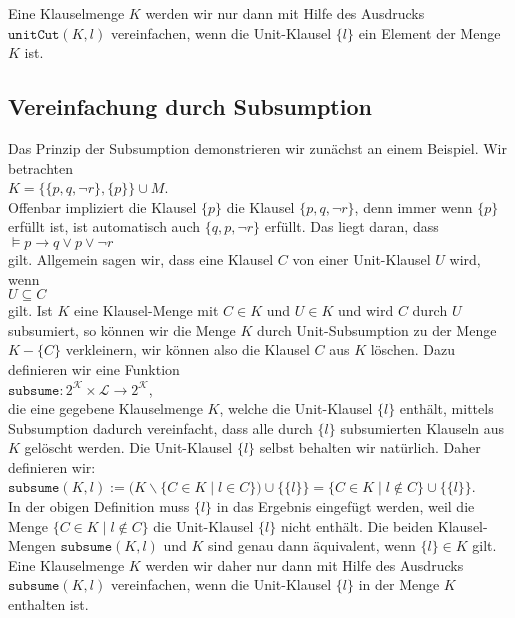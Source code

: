 Eine Klauselmenge $K$ werden wir nur dann mit Hilfe des Ausdrucks $\texttt{unitCut}(K, l)$ vereinfachen, wenn 
die Unit-Klausel $\{l\}$ ein Element der Menge $K$ ist.

\subsection{Vereinfachung durch Subsumption}
Das Prinzip der Subsumption demonstrieren wir zunächst an einem Beispiel.
Wir betrachten \\[0.2cm]
\hspace*{1.3cm} $K = \bigl\{ \{p, q, \neg r\}, \{p\} \bigr\} \cup M$. \\[0.2cm]
Offenbar impliziert die Klausel $\{p\}$ die Klausel $\{p, q, \neg r\}$, denn immer wenn
$\{p\}$ erfüllt ist, ist automatisch auch $\{q, p, \neg r\}$ erfüllt.  Das liegt daran, dass 
\\[0.2cm]
\hspace*{1.3cm} $\models p \rightarrow q \vee p \vee \neg r$
\\[0.2cm]
gilt.  Allgemein sagen wir, dass eine Klausel $C$
 von einer Unit-Klausel $U$  wird, wenn
\\[0.2cm]
\hspace*{1.3cm} $U \subseteq C$ \\[0.2cm]
gilt.  Ist $K$ eine Klausel-Menge mit $C \in K$ und $U \in K$ und wird
$C$ durch $U$ subsumiert, so können wir die Menge $K$ durch Unit-Subsumption zu der Menge $K - \{ C \}$
verkleinern, wir können also die Klausel $C$ aus $K$ löschen.  Dazu definieren wir eine Funktion
\\[0.2cm]
\hspace*{1.3cm}
$\texttt{subsume}: 2^\mathcal{K} \times \mathcal{L} \rightarrow 2^\mathcal{K}$,
\\[0.2cm]
die eine gegebene Klauselmenge $K$, welche die Unit-Klausel $\{l\}$ enthält, mittels Subsumption 
dadurch vereinfacht, dass alle durch $\{l\}$ subsumierten Klauseln aus $K$ gelöscht werden.
Die Unit-Klausel $\{l\}$ selbst behalten wir natürlich.  Daher definieren wir:
\\[0.2cm]
\hspace*{1.3cm}
$\texttt{subsume}(K, l) := 
\bigl(K \backslash \bigl\{ C \in K \mid l \in C \bigr\}\bigr) \cup \bigl\{\{l\}\bigr\} = 
\bigl\{ C \in K \mid l \not\in C \bigr\} \cup \bigl\{\{l\}\bigr\}$.
\\[0.2cm]
In der obigen Definition muss $\{l\}$ in das Ergebnis eingefügt werden, weil die Menge
\mbox{$\bigl\{ C \in K \mid l \not\in C \bigr\}$} die Unit-\-Klausel $\{l\}$ nicht enthält.  Die beiden Klausel-Mengen
$\mathtt{subsume}(K,l)$ und $K$ sind genau dann äquivalent, wenn $\{l\} \in K$ gilt.  
Eine Klauselmenge $K$ werden wir daher nur dann mit Hilfe des Ausdrucks $\texttt{subsume}(K, l)$ vereinfachen, wenn 
die Unit-Klausel $\{l\}$ in der Menge $K$ enthalten ist.

